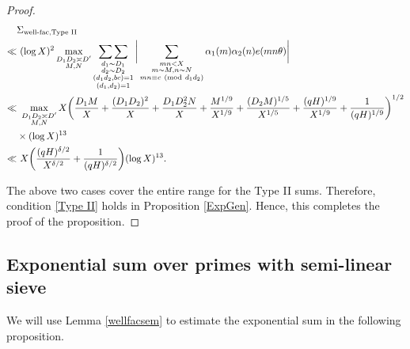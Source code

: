 \documentclass[12pt]{amsart}
\numberwithin{equation}{section}
\theoremstyle{remark}
\theoremstyle{definition}
\newcommand{\imod}[1]{\ (\mathrm{mod}\ #1)}
\begin{document}
\begin{proof}
\begin{align}
\notag &\Sigma_{\text{well-fac,Type II}}\\
\notag \ll &~(\log X)^2
\max_{\substack{D_1D_2 \asymp D'\\ M, N}}\mathop{\sum\sum}_{\substack{d_1\sim D_1\\d_2\sim D_2\\(d_1d_2, bc)=1\\(d_1,d_2)=1}}\bigg|\sum_{\substack{mn <X\\ m \sim M, n\sim N\\ mn \equiv c \imod {d_1d_2}}}{\alpha}_1(m){\alpha}_2(n)e(mn\theta)\bigg|\\
\notag \ll &~\max_{\substack{D_1D_2\asymp D'\\ M, N}}X\bigg(\dfrac{D_1M}{X} + \dfrac{(D_1D_2)^2}{X} + \dfrac{D_1D_2^2N}{X} + \dfrac{M^{1/9}}{X^{1/9}} + \dfrac{(D_2M)^{1/5}}{X^{1/5}} + \dfrac{(qH)^{1/9}}{X^{1/9}} + \dfrac{1}{(qH)^{1/9}}\bigg)^{1/2}\\
\notag &\times (\log X)^{13}\\
\notag \ll &~X\bigg(\dfrac{(qH)^{\delta/2}}{X^{\delta/2}} + \dfrac{1}{(qH)^{\delta/2}}\bigg)(\log X)^{13}.
\end{align}

 
The above two cases cover the entire range for the Type II sums. Therefore, condition \ref{Type II} holds in Proposition \ref{ExpGen}. Hence, this completes the proof of the proposition.
\end{proof}




\subsection{Exponential sum over primes with semi-linear sieve}

We will use Lemma \ref{wellfacsem} to estimate the exponential sum in the following proposition.
\end{document}
